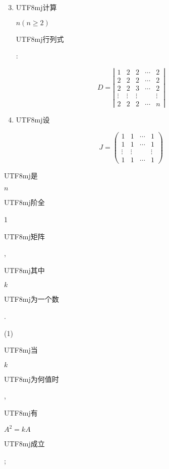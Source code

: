 \documentclass[10pt]{article}
\begin{document}
\begin{enumerate}
  \setcounter{enumi}{2}
  \item \begin{CJK}{UTF8}{mj}计算\end{CJK} $n(n \geqslant 2)$ \begin{CJK}{UTF8}{mj}行列式\end{CJK}:
\end{enumerate}
$$
D=\left|\begin{array}{ccccc}
1 & 2 & 2 & \cdots & 2 \\
2 & 2 & 2 & \cdots & 2 \\
2 & 2 & 3 & \cdots & 2 \\
\vdots & \vdots & \vdots & & \vdots \\
2 & 2 & 2 & \cdots & n
\end{array}\right|
$$

\begin{enumerate}
  \setcounter{enumi}{3}
  \item \begin{CJK}{UTF8}{mj}设\end{CJK}
\end{enumerate}
$$
J=\left(\begin{array}{cccc}
1 & 1 & \cdots & 1 \\
1 & 1 & \cdots & 1 \\
\vdots & \vdots & & \vdots \\
1 & 1 & \cdots & 1
\end{array}\right)
$$
\begin{CJK}{UTF8}{mj}是\end{CJK} $n$ \begin{CJK}{UTF8}{mj}阶全\end{CJK} 1 \begin{CJK}{UTF8}{mj}矩阵\end{CJK}, \begin{CJK}{UTF8}{mj}其中\end{CJK} $k$ \begin{CJK}{UTF8}{mj}为一个数\end{CJK}.

(1) \begin{CJK}{UTF8}{mj}当\end{CJK} $k$ \begin{CJK}{UTF8}{mj}为何值时\end{CJK}, \begin{CJK}{UTF8}{mj}有\end{CJK} $A^{2}=k A$ \begin{CJK}{UTF8}{mj}成立\end{CJK};
\end{document}
